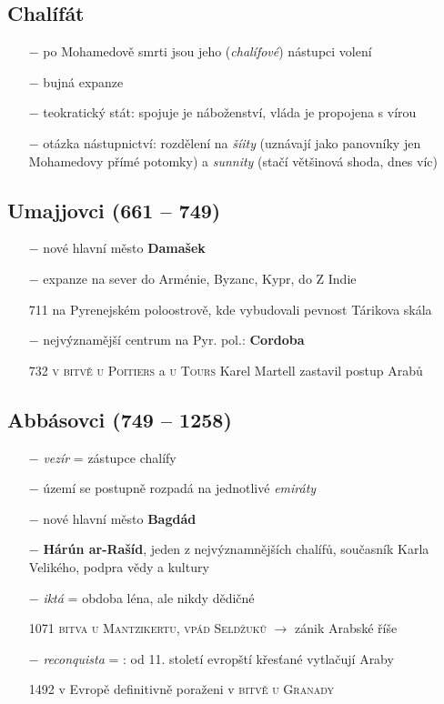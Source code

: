 \documentclass{article}
\begin{document}
\subsection*{Chalífát}
\begin{itemize}
    \vspace{-0.5em}
    \setlength\itemsep{0.15em}
    \item[$-$] po Mohamedově smrti jsou jeho (\textit{chalífové}) nástupci volení
    \item[$-$] bujná expanze
    \item[$-$] teokratický stát: spojuje je náboženství, vláda je propojena s vírou
    \item[$-$] otázka nástupnictví: rozdělení na \textit{šíity} (uznávají jako panovníky jen Mohamedovy přímé potomky) a \textit{sunnity} (stačí většinová shoda, dnes víc)
\end{itemize}

\subsection*{Umajjovci (661 -- 749)}
\begin{itemize}
    \vspace{-0.5em}
    \setlength\itemsep{0.15em}
    \item[$-$] nové hlavní město \textbf{Damašek}
    \item[$-$] expanze na sever do Arménie, Byzanc, Kypr, do Z Indie
    \item[711] na Pyrenejském poloostrově, kde vybudovali pevnost Tárikova skála
    \item[$-$] nejvýznamější centrum na Pyr. pol.: \textbf{Cordoba}
    \item[732] \textsc{v bitvě u Poitiers} a \textsc{u Tours} Karel Martell zastavil postup Arabů
\end{itemize}


\subsection*{Abbásovci (749 -- 1258)}
\begin{itemize}
    \vspace{-0.5em}
    \setlength\itemsep{0.15em}
    \item[$-$] \textit{vezír} = zástupce chalífy
    \item[$-$] území se postupně rozpadá na jednotlivé \textit{emiráty}
    \item[$-$] nové hlavní město \textbf{Bagdád}
    \item[$-$] \textbf{Hárún ar-Rašíd}, jeden z nejvýznamnějších chalífů, současník Karla Velikého, podpra vědy a kultury
    \item[$-$] \textit{iktá} = obdoba léna, ale nikdy dědičné
    \item[1071] \textsc{bitva u Mantzikertu, vpád Seldžuků} $\rightarrow$ zánik Arabské říše
    \item[$-$] \textit{reconquista} = : od 11. století evropští křesťané vytlačují Araby
    \item[1492] v Evropě definitivně poraženi v \textsc{bitvě u Granady}
\end{itemize}
\end{document}

